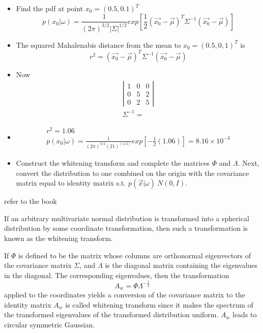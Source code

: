 \documentclass[11pt]{article}
\begin{document}
\begin{itemize}
	\item Find the pdf at point $x_0 = (0.5, 0.1)^T$
	\[
	p(x_0 | \omega) = \frac{1}{(2\pi)^{3/2} |\Sigma| ^{1/2}  }exp [ \frac{1}{2} (\vec{x_0} - \vec{\mu} ) ^T \Sigma ^{-1} (\vec{x_0} - \vec{\mu} )]
	\]
	\item The squared Mahalenabis distance from the mean to $x_0 = (0.5, 0,1)^T$ is 
	\[
	r^2 = (\vec{x_0} - \vec{\mu} ) ^T \Sigma ^{-1} (\vec{x_0} - \vec{\mu} )
	\]
	\item Now 
	\begin{eqnarray}
		\left|
		\begin{array}{lll}
			1 & 0 & 0 \\
			0 & 5 & 2 \\
			0 & 2 & 5 
		\end{array}
		\right| \\
		\Sigma^{-1} = 
	\end{eqnarray}
	\item 
	\begin{eqnarray}
		r^2	= 1.06 \\
		p(x_0 | \omega) = \frac{1}{(2\pi)^{3/2}(21)^(1/2)} exp [-\frac{1}{2} (1.06)] = 8.16 \times 10^{-3} 
	\end{eqnarray}
	\item Construct the whitening transform and complete the matrices $\Phi$ and $\Lambda$.  Next, convert the distribution to one combined on the origin with the covariance matrix equal to identity matrix s.t. $p(\vec{x} | \omega) ~ N(0, I)$.  
\end{itemize}

refer to the book \cite[34]{}

If an arbitrary multivariate normal distribution is transformed into a spherical distribution by some coordinate transformation, then such a transformation is known as the whitening transform.  

If $\Phi$ is defined to be the matrix whose columns are orthonormal eigenvectors of the covariance matrix $\Sigma$, and $\Lambda$ is the diagonal matrix containing the eigenvalues in the diagonal.  The corresponding eigenvalues, then the transformation 
\begin{equation}
	A_{w} = \Phi \Lambda^{-\frac{1}{2}}
\end{equation}
applied to the coordinates yields a conversion of the covariance matrix to the identity matrix $A_w$ is called whitening transform since it makes the spectrum of the transformed eigenvalues of the transformed distribution uniform.  $A_w$ leads to circular symmetric Gaussian. 
\end{document}
